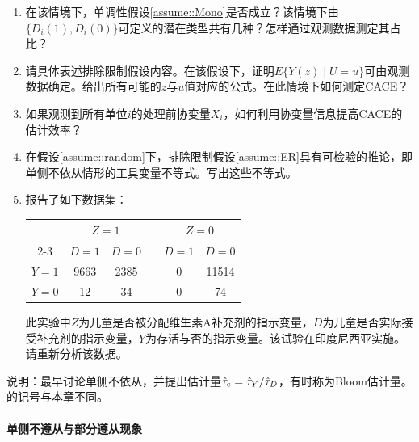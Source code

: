  
\begin{enumerate}
[(1)]
\item 
在该情境下，单调性假设\ref{assume::Mono}是否成立？该情境下由$\{ D_i(1), D_i(0)  \}$可定义的潜在类型共有几种？怎样通过观测数据测定其占比？  

\item 
请具体表述排除限制假设内容。在该假设下，证明$E\{  Y(z) \mid U = u \}$可由观测数据确定。给出所有可能的$z$与$u$值对应的公式。在此情境下如何测定CACE？  

 

\item
如果观测到所有单位$i$的处理前协变量$X_i$，如何利用协变量信息提高CACE的估计效率？  
 
 
 \item 
 在假设\ref{assume::random}下，排除限制假设\ref{assume::ER}具有可检验的推论，即单侧不依从情形的工具变量不等式。写出这些不等式。
 
\item
\citet{sommer1991estimating}报告了如下数据集： 
 
 \begin{center}
\begin{tabular}{cccccc} 
\hline 
      &   \multicolumn{2}{c}{$Z=1$}  &  &  \multicolumn{2}{c}{$Z=0$}  \\  \cline{2-3} \cline{5-6} 
      & $D=1$  &  $D=0$           &       &  $D=1$  &  $D=0$\\
 $Y=1$ &   9663    &     2385         &      &     0       &    11514       \\
 $Y=0$ &   12   &     34            &      &     0         &    74           \\  
 \hline 
\end{tabular}
 \end{center}
 
此实验中$Z$为儿童是否被分配维生素A补充剂的指示变量，$D$为儿童是否实际接受补充剂的指示变量，$Y$为存活与否的指示变量。该试验在印度尼西亚实施。请重新分析该数据。
 \end{enumerate}
 
 
说明：\citet{bloom1984accounting}最早讨论单侧不依从，并提出估计量$\hat\tau_{\textup{c}} = \hat\tau_Y / \hat\tau_D$，有时称为Bloom估计量。\citet{bloom1984accounting}的记号与本章不同。 

 
 
 
 
  \paragraph{单侧不遵从与部分遵从现象}
\label{para::one-sided-partial-adherence}
 
